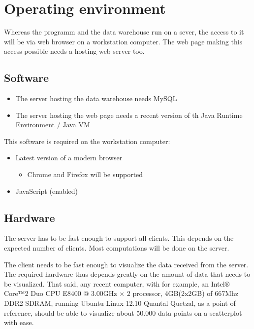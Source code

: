 \section{Operating environment}


Whereas the programm and the data warehouse run on a sever, 
the access to it will be via web browser on a workstation computer. 
The web page making this access possible needs a hosting web server too.


\subsection{Software}
\begin{itemize}
  \item The server hosting the data warehouse needs  MySQL %
  
  \item The server hosting the web page needs a 
  recent version of th Java Runtime Environment / Java VM  %
\end{itemize}


This software is required on the workstation computer:
\begin{itemize}
  \item Latest version of a modern browser
  \begin{itemize}
    \item Chrome and Firefox will be supported
  \end{itemize}
  \item JavaScript (enabled)
\end{itemize}


\subsection{Hardware}

The server has to be fast enough to support all clients. This depends on
the expected number of clients. Most computations will be done on the server.

The client needs to be fast enough to visualize the data received from the server. 
The required hardware thus depends greatly on the amount of data that needs to be 
visualized. That said, any recent computer, with for example, 
an Intel® Core™2 Duo CPU E8400 @ 3.00GHz × 2 processor, 
4GB(2x2GB) of 667Mhz DDR2 SDRAM, running Ubuntu Linux 12.10 Quantal Quetzal, 
as a point of reference, should be able to visualize about 50.000 
data points on a scatterplot with ease.


